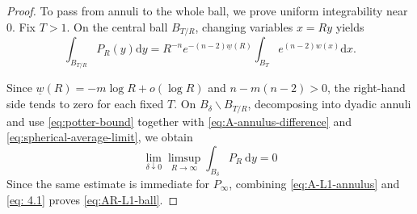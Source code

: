 \documentclass[10pt,a4paper]{amsart}
\numberwithin{equation}{section}
\newcommand{\dd}{\mathop{}\!\mathrm{d}}%
\begin{document}
\begin{proof}
To pass from annuli to the whole ball, we prove uniform integrability near 0. Fix $T>1$. On the central ball $B_{T / R}$, changing variables $x=R y$ yields
\[
\int_{B_{T / R}} P_R(y) \mathrm{d} y=R^{-n} e^{-(n-2) \underline{w}(R)} \int_{B_T} e^{(n-2) w(x)} \mathrm{d} x.
\]

Since $\underline{w}(R)=-m \log R+o(\log R)$ and $n-m(n-2)>0$, the right-hand side tends to zero for each fixed $T$. On $B_\delta \backslash B_{T / R}$, decomposing into dyadic annuli and use \cref{eq:potter-bound} together with \cref{eq:A-annulus-difference} and \cref{eq:spherical-average-limit}, we obtain
\begin{equation} \label{eq: 4.1}
\lim _{\delta \downarrow 0} \limsup _{R \rightarrow \infty} \int_{B_\delta} P_R \mathrm{~d} y=0 
\end{equation}
Since the same estimate is immediate for $P_{\infty}$, combining \cref{eq:A-L1-annulus} and \cref{eq: 4.1} proves \cref{eq:AR-L1-ball}.




\end{proof}
\end{document}
